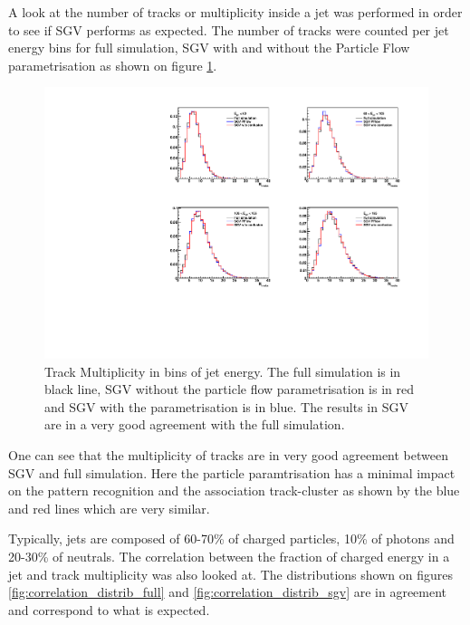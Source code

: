 A look at the number of tracks or multiplicity inside a jet was performed in order to see if SGV performs as expected. The number of tracks were counted per jet energy bins for full simulation, SGV with and without the Particle Flow parametrisation as shown on figure \ref{fig:trk_multiplicity}.

\begin{figure}[htbp!]
  \centering
  \includegraphics[width=1\linewidth]{Appendixes/fig_SGV/multiplicity_jet_track.pdf}
  \caption{Track Multiplicity in bins of jet energy. The full simulation is in black line, SGV without the particle flow parametrisation is in red and SGV with the parametrisation is in blue. The results in SGV are in a very good agreement with the full simulation.}
  \label{fig:trk_multiplicity}
\end{figure}

One can see that the multiplicity of tracks are in very good agreement between SGV and full simulation. Here the particle paramtrisation has a minimal impact on the pattern recognition and the association track-cluster as shown by the blue and red lines which are very similar.

Typically, jets are composed of 60-70\% of charged particles, 10\% of photons and 20-30\% of neutrals. The correlation between the fraction of charged energy in a jet and track multiplicity was also looked at. The distributions shown on figures \ref{fig:correlation_distrib_full} and \ref{fig:correlation_distrib_sgv} are in agreement and correspond to what is expected.

